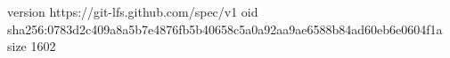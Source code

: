version https://git-lfs.github.com/spec/v1
oid sha256:0783d2c409a8a5b7e4876fb5b40658c5a0a92aa9ae6588b84ad60eb6e0604f1a
size 1602
